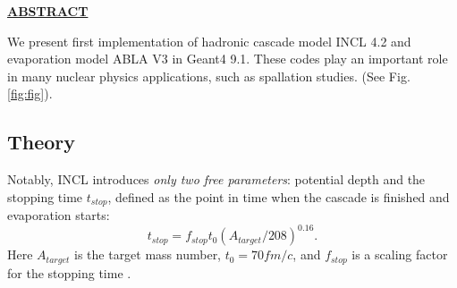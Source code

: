 \documentclass[10pt]{article}
\newenvironment{textbox}
{\begin{lrbox}{\dummybox}\begin{minipage}{0.9\columnwidth}}
{\end{minipage}\end{lrbox}\raisebox{-\depth}{\psshadowbox[framesep=1em,framearc=.1,shadow=true]{\usebox{\dummybox}}}\vspace{0.005\textheight}}
\begin{document}
\begin{center}
\begin{multicols}{3}
\begin{textbox}
\begin{center}
\textbf{\Large\color{udsubsect}\underline{ABSTRACT}}
\end{center}

{\color{udsect}
We present first implementation of hadronic cascade model INCL 4.2
\cite{incl} and evaporation model ABLA V3 \cite{abla} in Geant4 9.1.
\vskip0.5cm
These codes play an important role in many nuclear physics
applications, such as spallation studies. (See Fig. \ref{fig:fig}).
%
%
%

}

\end{textbox}
\begin{textbox}

\section*{\color{udsect} Theory}

Notably, INCL introduces \emph{only two free parameters}: potential depth
and the stopping time
$t_{stop}$, defined as the point in time when the cascade is
finished and evaporation starts:
\begin{equation}
t_{stop} = f_{stop}t_0 (A_{target}/208) ^{0.16}.
\end{equation}
Here $A_{target}$ is the target mass number, $t_0 = 70 fm/c$, and
$f_{stop}$ is a scaling factor for the stopping time \cite{g4physref}.



\end{textbox}
\end{multicols}
\end{center}
\end{document}
